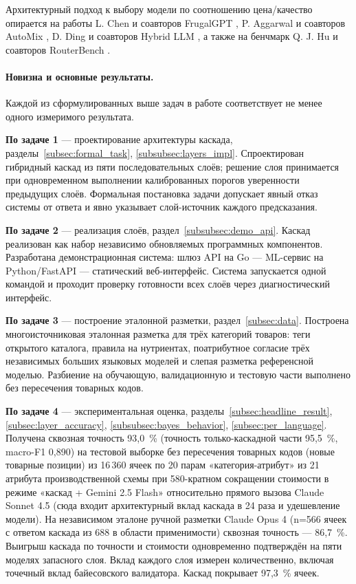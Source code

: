Архитектурный подход к выбору модели по соотношению цена/качество опирается на работы L. Chen и соавторов FrugalGPT \cite{ref_9}, P. Aggarwal и соавторов AutoMix \cite{ref_10}, D. Ding и соавторов Hybrid LLM \cite{ref_11}, а также на бенчмарк Q. J. Hu и соавторов RouterBench \cite{ref_12}.

\paragraph*{Новизна и основные результаты.}

Каждой из сформулированных выше задач в работе соответствует не менее одного измеримого результата.

\textbf{По задаче 1} — проектирование архитектуры каскада, разделы~\ref{subsec:formal_task}, \ref{subsubsec:layers_impl}. Спроектирован гибридный каскад из пяти последовательных слоёв; решение слоя принимается при одновременном выполнении калиброванных порогов уверенности предыдущих слоёв. Формальная постановка задачи допускает явный отказ системы от ответа и явно указывает слой-источник каждого предсказания.

\textbf{По задаче 2} — реализация слоёв, раздел~\ref{subsubsec:demo_api}. Каскад реализован как набор независимо обновляемых программных компонентов. Разработана демонстрационная система: шлюз API на Go — ML-сервис на Python/FastAPI — статический веб-интерфейс. Система запускается одной командой и проходит проверку готовности всех слоёв через диагностический интерфейс.

\textbf{По задаче 3} — построение эталонной разметки, раздел~\ref{subsec:data}. Построена многоисточниковая эталонная разметка для трёх категорий товаров: теги открытого каталога, правила на нутриентах, поатрибутное согласие трёх независимых больших языковых моделей и слепая разметка референсной моделью. Разбиение на обучающую, валидационную и тестовую части выполнено без пересечения товарных кодов.

\textbf{По задаче 4} — экспериментальная оценка, разделы~\ref{subsec:headline_result}, \ref{subsec:layer_accuracy}, \ref{subsubsec:bayes_behavior}, \ref{subsec:per_language}. Получена сквозная точность 93,0~\% (точность только-каскадной части 95,5~\%, macro-F1 0,890) на тестовой выборке без пересечения товарных кодов (новые товарные позиции) из 16\,360 ячеек по 20 парам «категория-атрибут» из 21 атрибута производственной схемы при 580-кратном сокращении стоимости в режиме «каскад + Gemini 2.5 Flash» относительно прямого вызова Claude Sonnet 4.5 (сюда входит архитектурный вклад каскада в 24 раза и удешевление модели). На независимом эталоне ручной разметки Claude Opus 4 (n=566 ячеек с ответом каскада из 688 в области применимости) сквозная точность — 86,7~\%. Выигрыш каскада по точности и стоимости одновременно подтверждён на пяти моделях запасного слоя. Вклад каждого слоя измерен количественно, включая точечный вклад байесовского валидатора. Каскад покрывает 97,3~\% ячеек.

